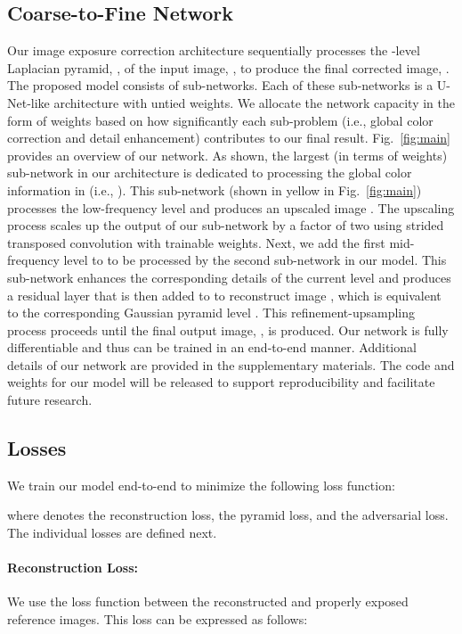 \documentclass[final]{cvpr}
\begin{document}
\subsection{Coarse-to-Fine Network} \label{subsec:network}
Our image exposure correction architecture sequentially processes the -level Laplacian pyramid, , of the input image, , to produce the final corrected image, . The proposed model consists of  sub-networks. Each of these sub-networks is a U-Net-like architecture \cite{unet} with untied weights. We allocate the network capacity in the form of weights based on how significantly each sub-problem (i.e., global color correction and detail enhancement) contributes to our final result.
Fig.\ \ref{fig:main} provides an overview of our network. As shown, the largest (in terms of weights) sub-network in our architecture is dedicated to processing the global color information in  (i.e., ). This sub-network (shown in yellow in Fig.\ \ref{fig:main}) processes the low-frequency level  and produces an upscaled image . The upscaling process scales up the output of our sub-network by a factor of two using strided transposed convolution with trainable weights. Next, we add the first mid-frequency level  to  to be processed by the second sub-network in our model. This sub-network enhances the corresponding details of the current level and produces a residual layer that is then added to  to reconstruct image , which is equivalent to the corresponding Gaussian pyramid level . This refinement-upsampling process proceeds until the final output image, , is produced. Our network is fully differentiable and thus can be trained in an end-to-end manner.
Additional details of our network are provided in the supplementary materials.
The code and weights for our model will be released to support reproducibility and facilitate future research.





\subsection{Losses}\label{subsec:losses}

We train our model end-to-end to minimize the following loss function:

where   denotes the reconstruction loss,  the pyramid loss, and  the adversarial loss. The individual losses are defined next.

\paragraph{Reconstruction Loss:}
We use the  loss function between the reconstructed and properly exposed reference images. This loss can be expressed as follows:
\end{document}
